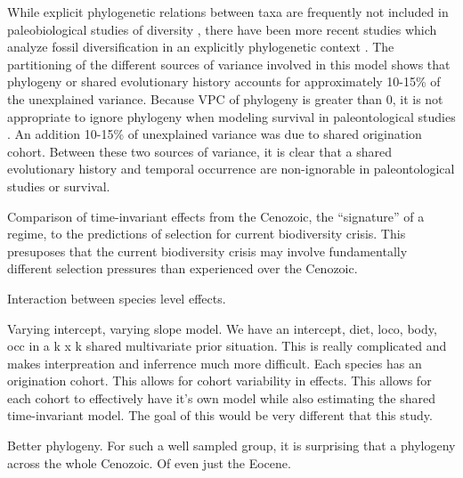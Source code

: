 \documentclass[12pt,letterpaper]{article}
\begin{document}
While explicit phylogenetic relations between taxa are frequently not included in paleobiological studies of diversity \citep{Alroy2009,Foote2013,Jablonski2006a,Hunt2007a,Liow2008,Payne2007,Alroy2000g,Jernvall2002,Jernvall2004,Marcot2014}, there have been more recent studies which analyze fossil diversification in an explicitly phylogenetic context \citep{Slater2012,Slater2013a,Tomiya2013,Harnik2014,Simpson2011a}. The partitioning of the different sources of variance involved in this model shows that phylogeny or shared evolutionary history accounts for approximately 10-15\% of the unexplained variance. Because VPC of phylogeny is greater than 0, it is not appropriate to ignore phylogeny when modeling survival in paleontological studies \citep{Housworth2004}. An addition 10-15\% of unexplained variance was due to shared origination cohort. Between these two sources of variance, it is clear that a shared evolutionary history and temporal occurrence are non-ignorable in paleontological studies or survival.

Comparison of time-invariant effects from the Cenozoic, the ``signature'' of a regime, to the predictions of selection for current biodiversity crisis. This presuposes that the current biodiversity crisis may involve fundamentally different selection pressures than experienced over the Cenozoic.

Interaction between species level effects.

Varying intercept, varying slope model. We have an intercept, diet, loco, body, occ in a k x k shared multivariate prior situation. This is really complicated and makes interpreation and inferrence much more difficult. Each species has an origination cohort. This allows for cohort variability in effects. This allows for each cohort to effectively have it's own model while also estimating the shared time-invariant model. The goal of this would be very different that this study.

Better phylogeny. For such a well sampled group, it is surprising that a phylogeny across the whole Cenozoic. Of even just the Eocene.
\end{document}
